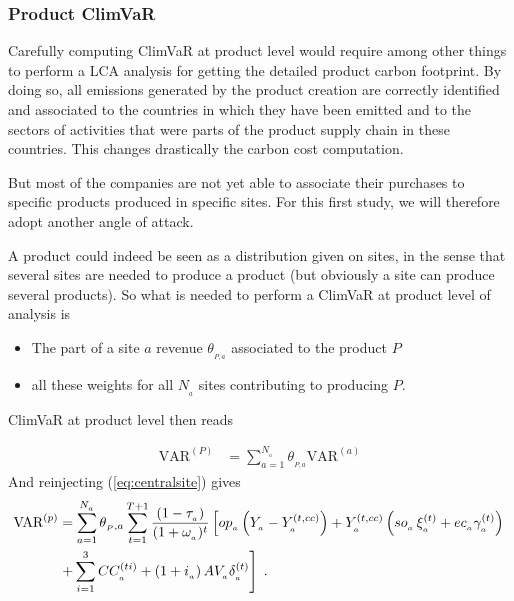 \subsubsection{Product ClimVaR}

Carefully computing ClimVaR at product level would require among other things to perform a LCA analysis for getting the detailed product carbon footprint. By doing so, all emissions generated by the product creation are correctly identified and associated to the countries in which they have been emitted and to the sectors of activities that were parts of the product supply chain in these countries. This changes drastically the carbon cost computation. 

\vspace{0.2cm} 

But most of the companies are not yet able to associate their purchases to specific products produced in specific sites. For this first study, we will therefore adopt another angle of attack.

\vspace{0.2cm}

A product could indeed be seen as a distribution given on sites, in the sense that several sites are needed to produce a product (but obviously a site can produce several products). So what is needed to perform a ClimVaR at product level of analysis is

\begin{itemize}
\item[$\bullet$] The part of a site $a$ revenue $\theta_{_{P,a}}$ associated to the product $P$
\item[$\bullet$] all these weights for all $N_{_a}$ sites contributing to producing $P$. 
\end{itemize}

ClimVaR at product level then reads

\begin{align}
\text{VAR}^{(P)}&=\sum_{a=1}^{N_{_a}} \theta_{_{P,a}} \text{VAR}^{(a)}
\end{align}
And reinjecting (\ref{eq:centralsite}) gives
\begin{align}
\text{VAR}^{(p)}&=\sum_{a=1}^{N_{_a}}\theta_{_P,a} \sum_{t=1}^{T+1}
%
\frac{\left( 1-\tau_{_{a}}\right)}{(1+\omega_{_{a}})^t}
%
\left[op_{_{a}}\left(Y_{_{a}}-Y^{(t,cc)}_{_{a}}\right)
%
+Y^{(t,cc)}_{_{a}}\left(so_{_{a}}\, \xi^{(t)}_{_{a}} + ec_{_{a}} \gamma^{(t)}_{_{a}}\right)
%
\right.\notag\\
%
&\left. +\sum_{i=1}^3CC^{(ti)}_{_{a}}+\left(1+i_{_{a}}\right) AV_{_{a}} \delta^{(t)}_{_{a}}
%
\right]\;.\label{eq:centralproduct}
\end{align}

